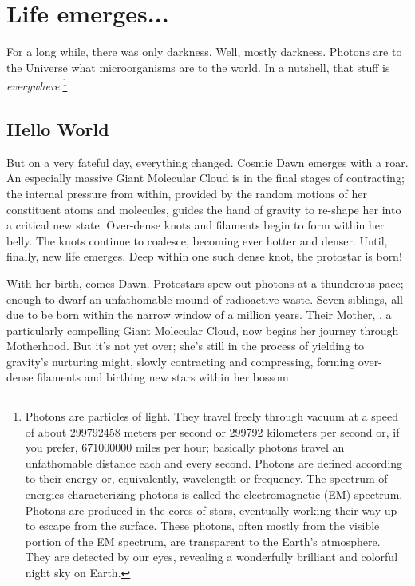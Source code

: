 \documentclass[main.tex]{subfiles}
\begin{document}
\chapter{Life emerges...}

\par \nar For a long while, there was only darkness.  Well, mostly darkness.  Photons are to the Universe what microorganisms are to the world.  In a nutshell, that stuff is \textit{everywhere}.\footnote{Photons are particles of light.  They travel freely through vacuum at a speed of about 299792458 meters per second or 299792 kilometers per second or, if you prefer, 671000000 miles per hour; basically photons travel an unfathomable distance each and every second.  Photons are defined according to their energy or, equivalently, wavelength or frequency.  The spectrum of energies characterizing photons is called the electromagnetic (EM) spectrum.  Photons are produced in the cores of stars, eventually working their way up to escape from the surface.  These photons, often mostly from the visible portion of the EM spectrum, are transparent to the Earth's atmosphere.  They are detected by our eyes, revealing a wonderfully brilliant and colorful night sky on Earth.}  

\section{Hello World} \label{hello}

\par \nar But on a very fateful day, everything changed.  Cosmic Dawn emerges with a roar.  An especially massive Giant Molecular Cloud is in the final stages of contracting; the internal pressure from within, provided by the random motions of her constituent atoms and molecules, guides the hand of gravity to re-shape her into a critical new state.  Over-dense knots and filaments begin to form within her belly.  The knots continue to coalesce, becoming ever hotter and denser. Until, finally, new life emerges.  Deep within one such dense knot, the protostar \rmmaia is born!

\par \nar With her birth, comes Dawn.  Protostars spew out photons at a thunderous pace; enough to dwarf an unfathomable mound of radioactive waste.  Seven siblings, all due to be born within the narrow window of a million years. Their Mother, \rmpleione, a particularly compelling Giant Molecular Cloud, now begins her journey through Motherhood.  But it's not yet over; she's still in the process of yielding to gravity's nurturing might, slowly contracting and compressing, forming over-dense filaments and birthing new stars within her bossom.  
\end{document}
